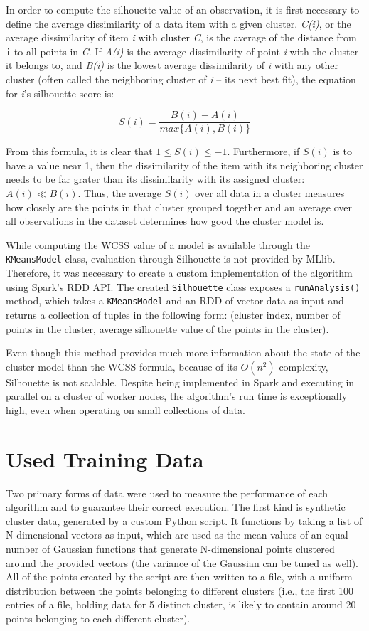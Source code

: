 \documentclass{l4proj}
\begin{document}
In order to compute the silhouette value of an observation, it is first necessary to define the average dissimilarity of a data item with a given cluster. \textit{C(i)}, or the average dissimilarity of item \textit{i} with cluster \textit{C}, is the average of the distance from \texttt{i} to all points in \textit{C}. If \textit{A(i)} is the average dissimilarity of point \textit{i} with the cluster it belongs to, and \textit{B(i)} is the lowest average dissimilarity of \textit{i} with any other cluster (often called the neighboring cluster of \textit{i} -- its next best fit), the equation for \textit{i}'s silhouette score is:

$$S(i) = \frac{B(i) - A(i)}{max\{A(i), B(i)\}}$$

From this formula, it is clear that $1 \leq S(i) \leq -1$. Furthermore, if $S(i)$ is to have a value near 1, then the dissimilarity of the item with its neighboring cluster needs to be far grater than its dissimilarity with its assigned cluster: $A(i) \ll B(i)$. Thus, the average $S(i)$ over all data in a cluster measures how closely are the points in that cluster grouped together and an average over all observations in the dataset determines how good the cluster model is.

While computing the WCSS value of a model is available through the \texttt{KMeansModel} class, evaluation through Silhouette is not provided by MLlib. Therefore, it was necessary to create a custom implementation of the algorithm using Spark's RDD API. The created \texttt{Silhouette} class exposes a \texttt{runAnalysis()} method, which takes a \texttt{KMeansModel} and an RDD of vector data as input and returns a collection of tuples in the following form: (cluster index, number of points in the cluster, average silhouette value of the points in the cluster).

Even though this method provides much more information about the state of the cluster model than the WCSS formula, because of its $O(n^2)$ complexity, Silhouette is not scalable. Despite being implemented in Spark and executing in parallel on a cluster of worker nodes, the algorithm's run time is exceptionally high, even when operating on small collections of data.

\section{Used Training Data}

Two primary forms of data were used to measure the performance of each algorithm and to guarantee their correct execution. The first kind is synthetic cluster data, generated by a custom Python script. It functions by taking a list of N-dimensional vectors as input, which are used as the mean values of an equal number of Gaussian functions that generate N-dimensional points clustered around the provided vectors (the variance of the Gaussian can be tuned as well). All of the points created by the script are then written to a file, with a uniform distribution between the points belonging to different clusters (i.e., the first 100 entries of a file, holding data for 5 distinct cluster, is likely to contain around 20 points belonging to each different cluster).
\end{document}
